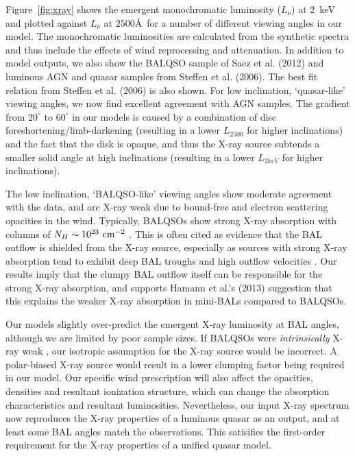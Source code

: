 \documentclass[useAMS,usenatbib]{mn2e_x}
\begin{document}
Figure~\ref{fig:xray} shows the emergent
monochromatic luminosity ($L_\nu$) at 2~keV and 
plotted against $L_\nu$ at $2500$\AA\ for a number of different viewing angles in our model.
The monochromatic luminosities are calculated from the synthetic spectra and thus include
the effects of wind reprocessing and attenuation. In addition to model outputs,
we also show the BALQSO sample of Saez et al. (2012) and luminous AGN and quasar
samples from Steffen et al. (2006). The best fit relation from Steffen et al. (2006) 
is also shown. For low inclination, `quasar-like' viewing angles,
we now find excellent agreement with AGN samples. The gradient from $20^\circ$ to
$60^\circ$ in our models is caused by a combination of disc foreshortening/limb-darkening 
(resulting in a lower $L_{2500}$ for higher inclinations) and the fact that the disk 
is opaque, and thus the X-ray source subtends a smaller solid angle at high inclinations
(resulting in a lower $L_{2keV}$ for higher inclinations). 



The low inclination, `BALQSO-like' viewing angles show moderate agreement with the data,
and are X-ray weak due to bound-free and electron scattering opacities in the wind.
Typically, BALQSOs show strong X-ray absorption with columns 
of $N_H\sim10^{23}~\rm{cm^{-2}}$ 
\citep{green1996,mathur2000,green2001,grupemathur2003}.
This is often cited as evidence that the BAL outflow is shielded from
the X-ray source, especially as sources with strong X-ray absorption tend
to exhibit deep BAL troughs and high outflow velocities 
\citep{brandt2000,laorbrandt2002,gallagher2006}.
Our results imply that the clumpy BAL outflow
itself can be responsible for the strong X-ray absorption, 
and supports Hamann et al.'s (2013) suggestion that 
this explains the weaker X-ray absorption in mini-BALs 
compared to BALQSOs.

Our models slightly over-predict the emergent X-ray luminosity at BAL angles, 
although we are limited by poor sample sizes. 
If BALQSOs were {\em intrinsically} 
X-ray weak \citep[as suggested by, e.g.][]{morabito2013},
our isotropic assumption for the X-ray source would be incorrect. 
A polar-biased X-ray source would result in a lower clumping factor being
required in our model. Our specific wind
prescription will also affect the opacities, densities and resultant
ionization structure, which can change the absorption characteristics and resultant
luminosities.
Nevertheless, our input X-ray spectrum
now reproduces the X-ray properties of a luminous quasar as an output,
and at least some BAL angles match the observations.
This satisifies the first-order requirement for the X-ray properties of 
a unified quasar model.
\end{document}
